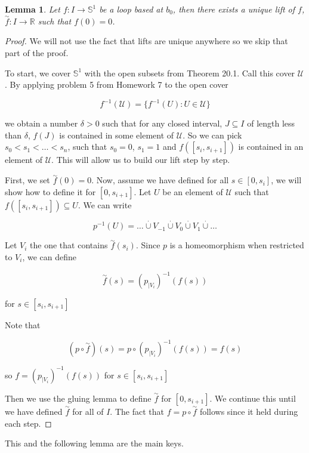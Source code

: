 \documentclass[a4paper]{article}
\newtheorem{lemma}[theorem]{Lemma}
\numberwithin{theorem}{section}
\begin{document}
\begin{lemma}
Let $f: I \rightarrow \mathbb{S}^1$ be a loop based at $b_0$, then there exists a unique lift of $f$, $\overset{\sim}{f}: I \rightarrow \mathbb{R}$ such that $f(0) = 0$.
\end{lemma}
\begin{proof}
We will not use the fact that lifts are unique anywhere so we skip that part of the proof.

To start, we cover $\mathbb{S}^1$ with the open subsets from Theorem 20.1. Call this cover $\mathcal{U}$. By applying problem 5 from Homework 7 to the open cover

$$ f^{-1}(\mathcal{U}) = \{f^{-1}(U) : U \in \mathcal{U}\} $$

we obtain a number $\delta >0$ such that for any closed interval, $J \subseteq I$ of length less than $\delta$, $f(J)$ is contained in some element of $\mathcal{U}$. So we can pick $s_0 < s_1 < \dots < s_n$, such that $s_0 = 0$, $s_1 = 1$ and $f([s_i, s_{i+1}])$ is contained in an element of $\mathcal{U}$. This will allow us to build our lift step by step.

First, we set $\overset{\sim}{f}(0) = 0$. Now, assume we have defined for all $s \in [0, s_i]$, we will show how to define it for $[0,s_{i+1}]$. Let $U$ be an element of $\mathcal{U}$ such that $f([s_i, s_{i+1}]) \subseteq U$. We can write

$$ p^{-1}(U) = \dots \overset{\cdot}{\cup} V_{-1} \overset{\cdot}{\cup} V_0 \overset{\cdot}{\cup} V_1 \overset{\cdot}{\cup} \dots $$

Let $V_i$ the one that contains $\overset{\sim}{f}(s_i)$. Since $p$ is a homeomorphism when restricted to $V_i$, we can define

$$ \overset{\sim}{f}(s) = (p_{|V_i})^{-1}(f(s)) $$

for $s \in [s_i, s_{i+1}]$

Note that

$$ (p \circ \overset{\sim}{f})(s) = p \circ (p_{|V_i})^{-1}(f(s)) = f(s) $$

so $f = (p_{|V_i})^{-1}(f(s))$ for $s \in [s_i,s_{i+1}]$

Then we use the gluing lemma to define $\overset{\sim}{f}$ for $[0,s_{i+1}]$. We continue this until we have defined $\overset{\sim}{f}$ for all of $I$. The fact that $f = p \circ \overset{\sim}{f}$ follows since it held during each step.

\end{proof}

This and the following lemma are the main keys.
\end{document}
